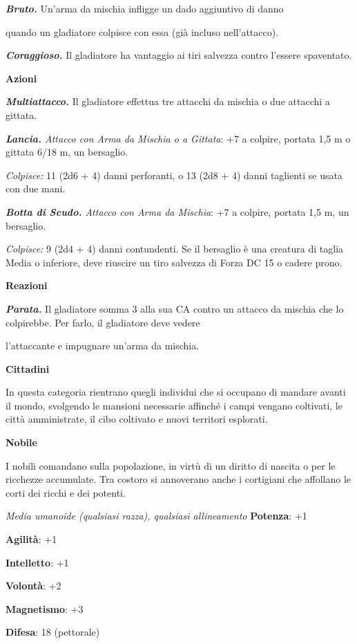 \begin{multicols}{2}
\emph{\textbf{Bruto.}} Un'arma da mischia infligge un dado aggiuntivo di
danno

quando un gladiatore colpisce con essa (già incluso nell'attacco).

\emph{\textbf{Coraggioso.}} Il gladiatore ha vantaggio ai tiri salvezza
contro l'essere spaventato.

\textbf{Azioni}

\emph{\textbf{Multiattacco.}} Il gladiatore effettua tre attacchi da
mischia o due attacchi a gittata.

\emph{\textbf{Lancia.} Attacco con Arma da Mischia o a Gittata}: +7 a
colpire, portata 1,5 m o gittata 6/18 m, un bersaglio.

\emph{Colpisce:} 11 (2d6 + 4) danni perforanti, o 13 (2d8 + 4) danni
taglienti se usata con due mani.

\emph{\textbf{Botta di Scudo.} Attacco con Arma da Mischia}: +7 a
colpire, portata 1,5 m, un bersaglio.

\emph{Colpisce:} 9 (2d4 + 4) danni contundenti. Se il bersaglio è una
creatura di taglia Media o inferiore, deve riuscire un tiro salvezza di Forza DC 15 o cadere prono.

\textbf{Reazioni}

\emph{\textbf{Parata.}} Il gladiatore somma 3 alla sua CA contro un
attacco da mischia che lo colpirebbe. Per farlo, il gladiatore deve
vedere

l'attaccante e impugnare un'arma da mischia.

\textbf{Cittadini}

In questa categoria rientrano quegli individui che si occupano di
mandare avanti il mondo, svolgendo le mansioni necessarie affinché i
campi vengano coltivati, le città amministrate, il cibo coltivato e
nuovi territori esplorati.

\textbf{Nobile}

I nobili comandano sulla popolazione, in virtù di un diritto di nascita
o per le ricchezze accumulate. Tra costoro si annoverano anche i
cortigiani che affollano le corti dei ricchi e dei potenti.

\emph{Media umanoide (qualsiasi razza), qualsiasi allineamento}
\textbf{Potenza}: +1

\textbf{Agilità}: +1

\textbf{Intelletto}: +1

\textbf{Volontà}: +2

\textbf{Magnetismo}: +3

\textbf{Difesa}: 18 (pettorale)


\end{multicols}
